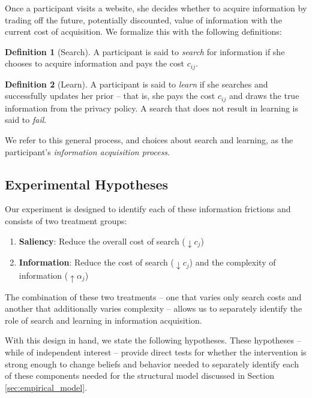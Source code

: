 \documentclass[12pt]{article}
\theoremstyle{definition}
\newtheorem{definition}{Definition}[section]
\theoremstyle{remark}
\begin{document}
Once a participant visits a website, she decides whether to acquire information by trading off the future, potentially discounted, value of information with the current cost of acquisition. We formalize this with the following definitions:

\begin{definition}[Search]
A participant is said to \emph{search} for information if she chooses to acquire information and pays the cost $c_{ij}$.
\end{definition}
 
\begin{definition}[Learn]
A participant is said to \emph{learn} if she searches and successfully updates her prior -- that is, she pays the cost $c_{ij}$ and draws the true information from the privacy policy. A search that does not result in learning is said to \emph{fail}.
\end{definition}

\noindent We refer to this general process, and choices about search and learning, as the participant's \emph{information acquisition process}.

\subsection{Experimental Hypotheses}

Our experiment is designed to identify each of these information frictions and consists of two treatment groups: 
\begin{enumerate}
    \item \textbf{Saliency}: Reduce the overall cost of search ($ \downarrow c_{j}$)
    \item \textbf{Information}: Reduce the cost of search ($\downarrow c_{j}$) and the complexity of information ($ \uparrow \alpha_{j}$)
\end{enumerate}
The combination of these two treatments -- one that varies only search costs and another that additionally varies complexity -- allows us to separately identify the role of search and learning in information acquisition. 

With this design in hand, we state the following hypotheses. These hypotheses -- while of independent interest -- provide direct tests for whether the intervention is strong enough to change beliefs and behavior needed to separately identify each of these components needed for the structural model discussed in Section \ref{sec:empirical_model}.
\end{document}
